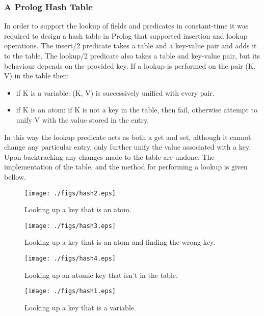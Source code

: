 \documentclass[12pt,a4paper,twoside,openright]{report}
\begin{document}
		\subsubsection{A Prolog Hash Table}

In order to support the lookup of fields and predicates in constant-time it was required to design a hash table in Prolog that supported insertion and lookup operations. The insert/2 predicate takes a table and a key-value pair and adds it to the table. The lookup/2 predicate also takes a table and key-value pair, but its behaviour depends on the provided key. If a lookup is performed on the pair (K, V) in the table then:

\begin{itemize}
	\item if K is a variable: (K, V) is successively unified with every pair.
	\item if K is an atom: if K is not a key in the table, then fail, otherwise attempt to unify V with the value stored in the entry.
\end{itemize}

In this way the lookup predicate acts as both a get and set, although it cannot change any particular entry, only further unify the value associated with a key. Upon backtracking any changes made to the table are undone. The implementation of the table, and the method for performing a lookup is given bellow.

\bigskip

\begin{figure}
 \centering
\texttt{[image: ./figs/hash2.eps]}
\caption{Looking up a key that is an atom.}
\label{fig:2}
\end{figure}
\begin{figure}
 \centering
\texttt{[image: ./figs/hash3.eps]}
\caption{Looking up a key that is an atom and finding the wrong key.}
\label{fig:3}
\end{figure}
\begin{figure}
 \centering
\texttt{[image: ./figs/hash4.eps]}
\caption{Looking up an atomic key that isn't in the table.}
\label{fig:4}
\end{figure}
\begin{figure}
 \centering
\texttt{[image: ./figs/hash1.eps]}
\caption{Looking up a key that is a variable.}
\label{fig:5}
\end{figure}
\end{document}
